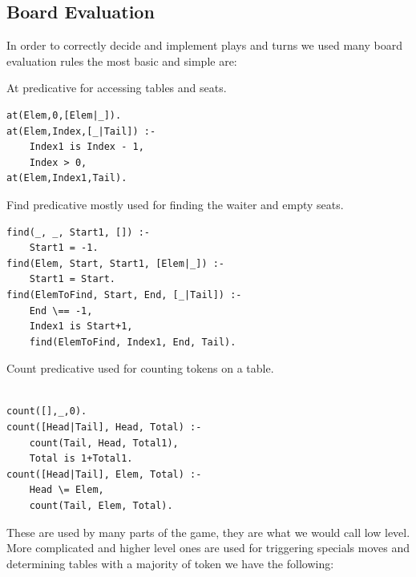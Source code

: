 \documentclass[a4paper]{article}
\begin{document}
\subsection{Board Evaluation}

In order to correctly decide and implement plays and turns we used many board evaluation rules the most basic and simple are:

        \begin{listing}[H]
            \caption{At predicative for accessing tables and seats.}
            \label{Codigo:cod_at}
            \begin{verbatim}
at(Elem,0,[Elem|_]).
at(Elem,Index,[_|Tail]) :-
    Index1 is Index - 1,
    Index > 0,
at(Elem,Index1,Tail).

    \end{verbatim}

    \end{listing}


        \begin{listing}[H]
        \caption{Find predicative mostly used for finding the waiter and empty seats.}
        \label{Codigo:cod_find}
        \begin{verbatim}
find(_, _, Start1, []) :-
    Start1 = -1.
find(Elem, Start, Start1, [Elem|_]) :-
    Start1 = Start.
find(ElemToFind, Start, End, [_|Tail]) :-
    End \== -1,
    Index1 is Start+1,
    find(ElemToFind, Index1, End, Tail).

        \end{verbatim}

        \end{listing}


        \begin{listing}[H]
        \caption{Count predicative used for counting tokens on a table.}
        \label{Codigo:cod_count}
        \begin{verbatim}

count([],_,0).
count([Head|Tail], Head, Total) :-
    count(Tail, Head, Total1),
    Total is 1+Total1.
count([Head|Tail], Elem, Total) :-
    Head \= Elem,
    count(Tail, Elem, Total).

        \end{verbatim}

        \end{listing}


These are used by many parts of the game, they are what we would call low level.
More complicated and higher level ones are used for triggering specials moves and determining tables
with a majority of token we have the following:
\end{document}
